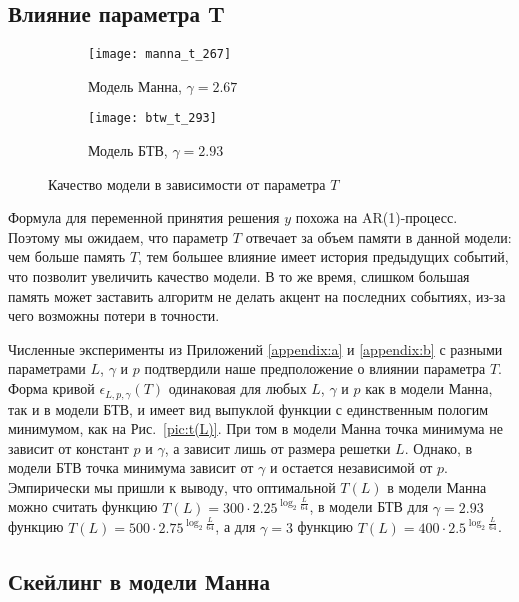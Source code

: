 \subsection{Влияние параметра T}

\begin{figure}[h]
	\centering
	\begin{subfigure}[b]{0.45\textwidth}
		\centering
		\texttt{[image: manna\_t\_267]}
		\caption{Модель Манна, $\gamma=2.67$}
		\label{pic:manna_t_267}
	\end{subfigure}
	\begin{subfigure}[b]{0.45\textwidth}
		\centering
		\texttt{[image: btw\_t\_293]}
		\caption{Модель БТВ, $\gamma=2.93$}
		\label{pic:btw_t_293}
	\end{subfigure}
	\caption{Качество модели в зависимости от параметра $T$}
	\label{pic:t(L)}
\end{figure}

Формула для переменной принятия решения $y$ похожа на AR(1)-процесс. Поэтому мы ожидаем, что параметр $T$ отвечает за объем памяти в данной модели: чем больше память $T$, тем большее влияние имеет история предыдущих событий, что позволит увеличить качество модели. В то же время, слишком большая память может заставить алгоритм не делать акцент на последних событиях, из-за чего возможны потери в точности.

Численные эксперименты из Приложений \eqref{appendix:a} и \eqref{appendix:b} с разными параметрами $L$, $\gamma$ и $p$ подтвердили наше предположение  о влиянии параметра $T$. Форма кривой $\epsilon_{L, p, \gamma}(T)$ одинаковая для любых $L$, $\gamma$ и $p$ как в модели Манна, так и в модели БТВ, и имеет вид выпуклой функции с единственным пологим минимумом, как на Рис.~\eqref{pic:t(L)}. При том в модели Манна точка минимума не зависит от констант $p$ и $\gamma$, а зависит лишь от размера решетки $L$. Однако, в модели БТВ точка минимума зависит от $\gamma$ и остается независимой от $p$. Эмпирически мы пришли к выводу, что оптимальной $T(L)$ в модели Манна можно считать функцию $T(L) = 300 \cdot 2.25^{\log_{2}\frac{L}{64}}$, в модели БТВ для $\gamma=2.93$ функцию $T(L) = 500 \cdot 2.75^{\log_{2}\frac{L}{64}}$, а для $\gamma=3$ функцию $T(L) = 400 \cdot 2.5^{\log_{2}\frac{L}{64}}$.

\clearpage
\subsection{Скейлинг в модели Манна}

